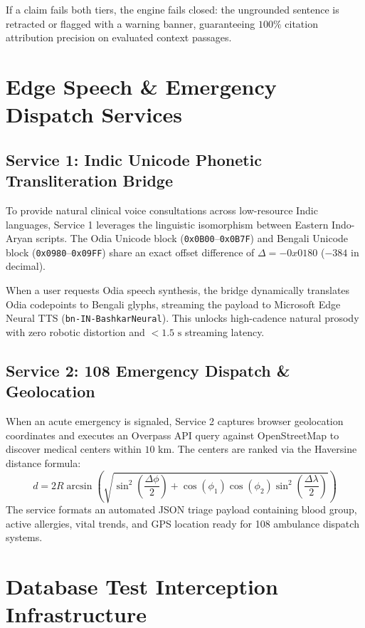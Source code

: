 If a claim fails both tiers, the engine fails closed: the ungrounded sentence is retracted or flagged with a warning banner, guaranteeing $100\%$ citation attribution precision on evaluated context passages.


\section{Edge Speech \& Emergency Dispatch Services}
\label{sec:impl_services}

\subsection{Service 1: Indic Unicode Phonetic Transliteration Bridge}
To provide natural clinical voice consultations across low-resource Indic languages, Service 1 leverages the linguistic isomorphism between Eastern Indo-Aryan scripts. The Odia Unicode block (\texttt{0x0B00}--\texttt{0x0B7F}) and Bengali Unicode block (\texttt{0x0980}--\texttt{0x09FF}) share an exact offset difference of $\Delta = -0x0180$ ($-384$ in decimal). 

When a user requests Odia speech synthesis, the bridge dynamically translates Odia codepoints to Bengali glyphs, streaming the payload to Microsoft Edge Neural TTS (\texttt{bn\allowbreak-IN\allowbreak-Bashkar\allowbreak Neural}). This unlocks high-cadence natural prosody with zero robotic distortion and $<1.5\text{ s}$ streaming latency.

\subsection{Service 2: 108 Emergency Dispatch \& Geolocation}
When an acute emergency is signaled, Service 2 captures browser geolocation coordinates and executes an Overpass API query against OpenStreetMap to discover medical centers within $10\text{ km}$. The centers are ranked via the Haversine distance formula:
\begin{equation}
    d = 2R \arcsin\left(\sqrt{\sin^2\left(\frac{\Delta \phi}{2}\right) + \cos(\phi_1)\cos(\phi_2)\sin^2\left(\frac{\Delta \lambda}{2}\right)}\right)
\end{equation}
The service formats an automated JSON triage payload containing blood group, active allergies, vital trends, and GPS location ready for 108 ambulance dispatch systems.


\section{Database Test Interception Infrastructure}
\label{sec:impl_database_interceptor}

